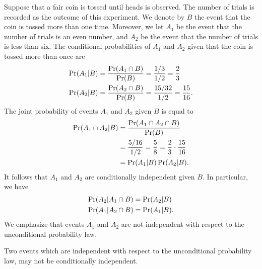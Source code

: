 \begin{example}
Suppose that a fair coin is tossed until heads is observed.
The number of trials is recorded as the outcome of this experiment.
We denote by $B$ the event that the coin is tossed more than one time.
Moreover, we let $A_1$ be the event that the number of trials is an even number, and $A_2$ be the event that the number of trials is less than six.
The conditional probabilities of $A_1$ and $A_2$ given that the coin is tossed more than once are
\begin{align*}
\Pr (A_1 | B) &= \frac{ \Pr (A_1 \cap B) }{ \Pr (B) }
= \frac{1/3}{1/2} = \frac{2}{3} \\
\Pr (A_2 | B) &= \frac{ \Pr (A_2 \cap B) }{ \Pr (B) }
= \frac{15/32}{1/2} = \frac{15}{16} .
\end{align*}
The joint probability of events $A_1$ and $A_2$ given $B$ is equal to
\begin{equation*}
\begin{split}
\Pr (A_1 \cap A_2 | B) &= \frac{ \Pr (A_1 \cap A_2 \cap B) }{ \Pr (B) } \\
&= \frac{5/16}{1/2} = \frac{5}{8} = \frac{2}{3} \cdot \frac{15}{16} \\
&= \Pr (A_1 | B) \Pr (A_2 | B) .
\end{split}
\end{equation*}
It follows that $A_1$ and $A_2$ are conditionally independent given $B$.
In particular, we have
\begin{align*}
\Pr (A_2 | A_1 \cap  B) &= \Pr (A_2 | B) \\
\Pr (A_1 | A_2 \cap  B) &= \Pr (A_1 | B) .
\end{align*}
We emphasize that events $A_1$ and $A_2$ are not independent with respect to the unconditional probability law.
\end{example}

Two events which are independent with respect to the unconditional probability law, may not be conditionally independent.

